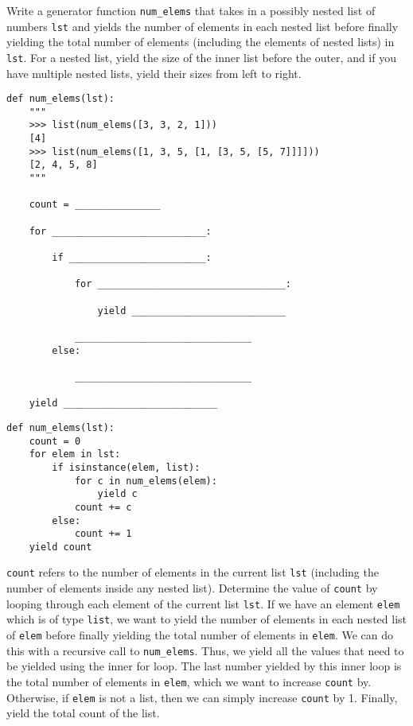 \question
Write a generator function \lstinline{num_elems} that takes in a possibly nested list of numbers \lstinline{lst} and yields the number of elements in each nested list before finally yielding the total number of elements (including the elements of nested lists) in \lstinline{lst}. For a nested list, yield the size of the inner list before the outer, and if you have multiple nested lists, yield their sizes from left to right.

\begin{lstlisting}
def num_elems(lst):
    """
    >>> list(num_elems([3, 3, 2, 1]))
    [4]
    >>> list(num_elems([1, 3, 5, [1, [3, 5, [5, 7]]]]))
    [2, 4, 5, 8]
    """

    count = _______________

    for ___________________________:

        if ________________________:

            for _________________________________:

                yield ___________________________

            _______________________________
        else:

            _______________________________

    yield ___________________________
\end{lstlisting} 
\begin{solution}
\begin{lstlisting}
def num_elems(lst):
    count = 0
    for elem in lst:
        if isinstance(elem, list):
            for c in num_elems(elem):
                yield c
            count += c
        else:
            count += 1
    yield count
\end{lstlisting}

\lstinline{count} refers to the number of elements in the current list \lstinline{lst} (including the number of elements inside any nested list). Determine the value of \lstinline{count} by looping through each element of the current list \lstinline{lst}. If we have an element \lstinline{elem} which is of type \lstinline{list}, we want to yield the number of elements in each nested list of \lstinline{elem} before finally yielding the total number of elements in \lstinline{elem}. We can do this with a recursive call to \lstinline{num_elems}. Thus, we yield all the values that need to be yielded using the inner for loop. The last number yielded by this inner loop is the total number of elements in \lstinline{elem}, which we want to increase \lstinline{count} by. Otherwise, if \lstinline{elem} is not a list, then we can simply increase \lstinline{count} by 1. Finally, yield the total count of the list.
\end{solution}

